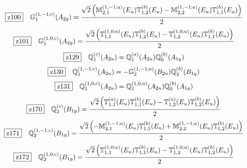 \documentclass[fleqn,10pt,landscape]{jsarticle}
\begin{document}
\begin{dmath*}
\hspace*{3mm}\fbox{z100}\quad \mathbb{G}_{1}^{(1,-1;c)}(A_{2g})=\frac{\sqrt{2} \left(\mathbb{M}_{2,1}^{(1,-1;a)}(E_{u}) \mathbb{T}_{1,2}^{(b)}(E_{u}) - \mathbb{M}_{2,2}^{(1,-1;a)}(E_{u}) \mathbb{T}_{1,1}^{(b)}(E_{u})\right)}{2}
\end{dmath*}
\begin{dmath*}
\hspace*{3mm}\fbox{z101}\quad \mathbb{G}_{1}^{(1,0;c)}(A_{2g})=\frac{\sqrt{2} \left(\mathbb{T}_{1,1}^{(1,0;a)}(E_{u}) \mathbb{T}_{1,2}^{(b)}(E_{u}) - \mathbb{T}_{1,2}^{(1,0;a)}(E_{u}) \mathbb{T}_{1,1}^{(b)}(E_{u})\right)}{2}
\end{dmath*}
\begin{dmath*}
\hspace*{3mm}\fbox{z129}\quad \mathbb{Q}_{1}^{(c)}(A_{2u})=\mathbb{Q}_{1}^{(a)}(A_{2u}) \mathbb{Q}_{0}^{(b)}(A_{1g})
\end{dmath*}
\begin{dmath*}
\hspace*{3mm}\fbox{z130}\quad \mathbb{Q}_{1}^{(1,-1;c)}(A_{2u})=- \mathbb{G}_{2}^{(1,-1;a)}(B_{2u}) \mathbb{Q}_{2}^{(b)}(B_{1g})
\end{dmath*}
\begin{dmath*}
\hspace*{3mm}\fbox{z131}\quad \mathbb{Q}_{1}^{(1,0;c)}(A_{2u})=\mathbb{Q}_{1}^{(1,0;a)}(A_{2u}) \mathbb{Q}_{0}^{(b)}(A_{1g})
\end{dmath*}
\begin{dmath*}
\hspace*{3mm}\fbox{z170}\quad \mathbb{Q}_{2}^{(c)}(B_{1g})=\frac{\sqrt{2} \left(\mathbb{T}_{1,1}^{(a)}(E_{u}) \mathbb{T}_{1,1}^{(b)}(E_{u}) - \mathbb{T}_{1,2}^{(a)}(E_{u}) \mathbb{T}_{1,2}^{(b)}(E_{u})\right)}{2}
\end{dmath*}
\begin{dmath*}
\hspace*{3mm}\fbox{z171}\quad \mathbb{Q}_{2}^{(1,-1;c)}(B_{1g})=\frac{\sqrt{2} \left(- \mathbb{M}_{2,1}^{(1,-1;a)}(E_{u}) \mathbb{T}_{1,1}^{(b)}(E_{u}) + \mathbb{M}_{2,2}^{(1,-1;a)}(E_{u}) \mathbb{T}_{1,2}^{(b)}(E_{u})\right)}{2}
\end{dmath*}
\begin{dmath*}
\hspace*{3mm}\fbox{z172}\quad \mathbb{Q}_{2}^{(1,0;c)}(B_{1g})=\frac{\sqrt{2} \left(\mathbb{T}_{1,1}^{(1,0;a)}(E_{u}) \mathbb{T}_{1,1}^{(b)}(E_{u}) - \mathbb{T}_{1,2}^{(1,0;a)}(E_{u}) \mathbb{T}_{1,2}^{(b)}(E_{u})\right)}{2}
\end{dmath*}
\end{document}
